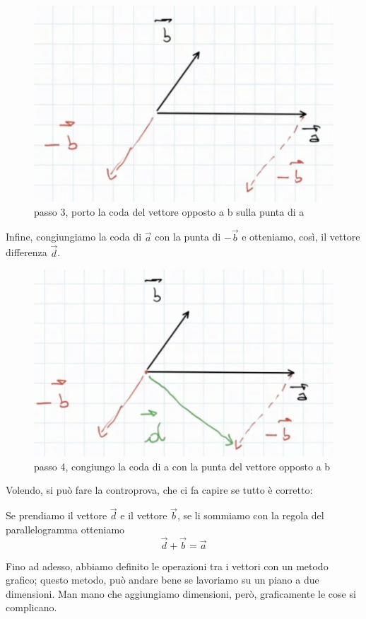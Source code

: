 \begin{figure}[h]
\begin{center}
\includegraphics[width = 0.5 \textwidth]{lezione1/images/differenza3}
\caption{passo 3, porto la coda del vettore opposto a b sulla punta di a}
\label{fig:differenza3}
\end{center}
\end{figure}

Infine, congiungiamo la coda di $ \overrightarrow{a} $ con la punta di $- \overrightarrow{b}$ e otteniamo, così, il vettore differenza $\overrightarrow{d} $.

\begin{figure}[h]
\begin{center}
\includegraphics[width = 0.5 \textwidth]{lezione1/images/differenza4}
\caption{passo 4, congiungo la coda di a con la punta del vettore opposto a b}
\label{fig:differenza4}
\end{center}
\end{figure}

Volendo, si può fare la controprova, che ci fa capire se tutto è corretto:

Se prendiamo il vettore $ \overrightarrow{d} $ e il vettore $\overrightarrow{b}$, se li sommiamo con la regola del parallelogramma otteniamo
$$ \overrightarrow{d} + \overrightarrow{b} = \overrightarrow{a} $$

Fino ad adesso, abbiamo definito le operazioni tra i vettori con un metodo grafico; questo metodo, può andare bene se lavoriamo su un piano a due dimensioni. Man mano che aggiungiamo dimensioni, però, graficamente le cose si complicano.

\newpage

